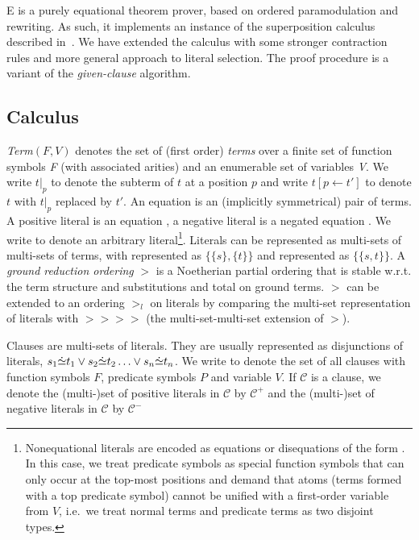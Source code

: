 \documentclass{article}
\begin{document}
E is a purely equational theorem prover, based on ordered
paramodulation and rewriting. As such, it implements an instance of
the superposition calculus described in~\cite{BG94}. We have extended
the calculus with some stronger contraction rules and more general
approach to literal selection. The proof procedure is a variant of the
\emph{given-clause} algorithm.


\subsection{Calculus}

\emph{Term}$(F,V)$ denotes the set of (first order) \emph{terms} over
a finite set of function symbols \emph{F} (with associated arities)
and an enumerable set of variables \emph{V}. We write $t|_p$ to denote
the subterm of $t$ at a position $p$ and write $t[p\leftarrow t']$ to
denote $t$ with $t|_p$ replaced by $t'$. An equation  is an
(implicitly symmetrical) pair of terms. A positive literal is an
equation , a negative literal is a negated equation
.  We write  to denote an arbitrary
literal\footnote{Nonequational literals are encoded as equations or
  disequations of the form . In this
  case, we treat predicate symbols as special function symbols that
  can only occur at the top-most positions and demand that atoms
  (terms formed with a top predicate symbol) cannot be unified with a
  first-order variable from $V$, i.e.\ we treat normal terms and
  predicate terms as two disjoint types.}. Literals can be represented
as multi-sets of multi-sets of terms, with  represented as
$\{\{s\},\{t\}\}$ and  represented as $\{\{s, t\}\}$.  A
\emph{ground reduction ordering} $>$ is a Noetherian partial ordering
that is stable w.r.t. the term structure and substitutions and total
on ground terms. $>$ can be extended to an ordering $>_l$ on literals
by comparing the multi-set representation of literals with $>\!\!>
>\!\!>$ (the multi-set-multi-set extension of $>$).

Clauses are multi-sets of literals. They are usually represented as
disjunctions of literals, $s_1\dot{\simeq}t_1 \vee s_2\dot{\simeq}t_2 \ldots
\vee s_n\dot{\simeq}t_n$. We write  to denote the set
of all clauses with function symbols $F$, predicate symbols $P$ and
variable $V$. If $\mathcal{C}$ is a clause, we denote the (multi-)set
of positive literals in $\mathcal{C}$ by $\mathcal{C^+}$ and the
(multi-)set of negative literals in $\mathcal{C}$ by $\mathcal{C^-}$
\end{document}
